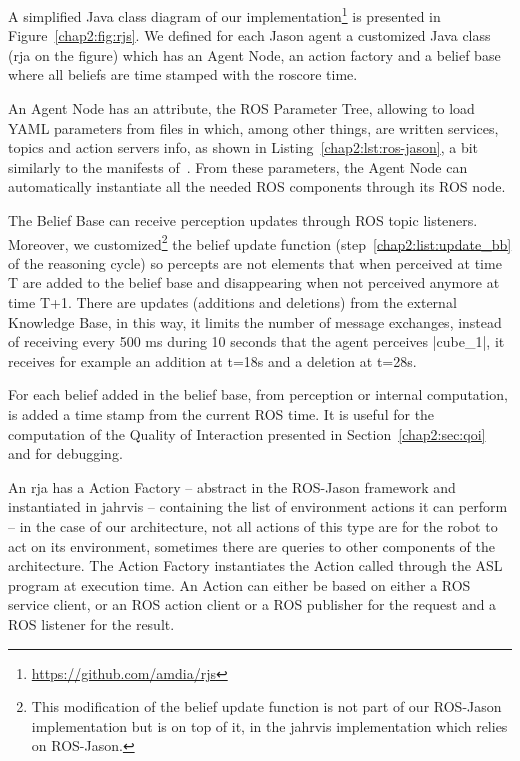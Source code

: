 \documentclass[a4paper,11pt,twoside]{StyleThese}
\begin{document}
A simplified Java class diagram of our  implementation\footnote{\url{https://github.com/amdia/rjs}} is presented in Figure~\ref{chap2:fig:rjs}. We defined for each Jason agent a customized Java class (\acrfull{rja} on the figure) which has an Agent Node, an action factory and a belief base where all beliefs are time stamped with the roscore time. 

An Agent Node has an attribute, the ROS Parameter Tree, allowing to load YAML parameters from files in which, among other things, are written services, topics and action servers info, as shown in Listing~\ref{chap2:lst:ros-jason}, a bit similarly to the manifests of~\cite{silva_2020_embedded}. From these parameters, the Agent Node can automatically instantiate all the needed ROS components through its ROS node. 

The Belief Base can receive perception updates through ROS topic listeners. Moreover, we customized\footnote{This modification of the belief update function is not part of our ROS-Jason implementation but is on top of it, in the \acrshort{jahrvis} implementation which relies on ROS-Jason.} the belief update function (step~\ref{chap2:list:update_bb} of the reasoning cycle) so percepts are not elements that when perceived at time T are added to the belief base and disappearing when not perceived anymore at time T+1. There are updates (additions and deletions) from the external Knowledge Base, in this way, it limits the number of message exchanges, \ie instead of receiving every 500 ms during 10 seconds that the agent perceives |cube_1|, it receives for example an addition at t=18s and a deletion at t=28s. 

For each belief added in the belief base, from perception or internal computation, is added a time stamp from the current ROS time. It is useful for the computation of the Quality of Interaction presented in Section~\ref{chap2:sec:qoi} and for debugging.

An \acrshort{rja} has a Action Factory -- abstract in the ROS-Jason framework and instantiated in \acrshort{jahrvis} -- containing the list of environment actions it can perform -- in the case of our architecture, not all actions of this type are for the robot to act on its environment, sometimes there are queries to other components of the architecture. The Action Factory instantiates the Action called through the ASL program at execution time. An Action can either be based on either a ROS service client, or an ROS action client or a ROS publisher for the request and a ROS listener for the result. 
\end{document}
